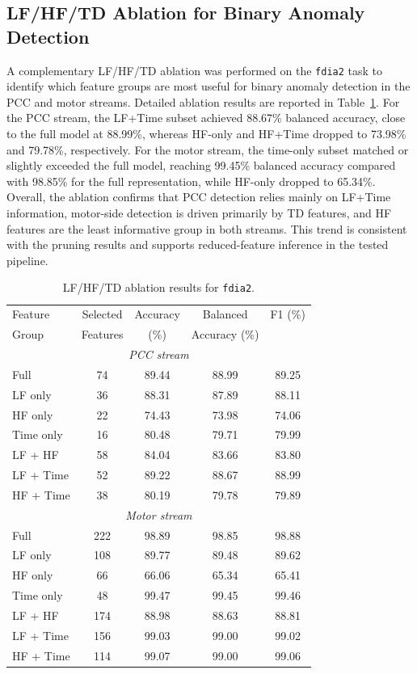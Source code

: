 \documentclass[lettersize,journal]{IEEEtran}
\begin{document}
\subsection{LF/HF/TD Ablation for Binary Anomaly Detection}
\label{sec:lfhf_ablation}
A complementary LF/HF/TD ablation was performed on the \texttt{fdia2} task to identify which feature groups are most useful for binary anomaly detection in the PCC and motor streams. Detailed ablation results are reported in Table~\ref{tab:lfhf_ablation_anomaly2}. For the PCC stream, the LF+Time subset achieved 88.67\% balanced accuracy, close to the full model at 88.99\%, whereas HF-only and HF+Time dropped to 73.98\% and 79.78\%, respectively. For the motor stream, the time-only subset matched or slightly exceeded the full model, reaching 99.45\% balanced accuracy compared with 98.85\% for the full representation, while HF-only dropped to 65.34\%. Overall, the ablation confirms that PCC detection relies mainly on LF+Time information, motor-side detection is driven primarily by TD features, and HF features are the least informative group in both streams. This trend is consistent with the pruning results and supports reduced-feature inference in the tested pipeline.
\begin{table}[t]
\centering
\caption{LF/HF/TD ablation results for \texttt{fdia2}.}
\label{tab:lfhf_ablation_anomaly2}
\renewcommand{\arraystretch}{1.15}
\begin{tabular}{l c c c c}
\hline
Feature & Selected & Accuracy & Balanced & F1 (\%) \\
Group & Features & (\%) & Accuracy (\%) & \\
\hline
\multicolumn{5}{c}{\textit{PCC stream}} \\
\hline
Full & 74  & 89.44 & 88.99 & 89.25 \\
LF only   & 36  & 88.31 & 87.89 & 88.11 \\
HF only   & 22  & 74.43 & 73.98 & 74.06 \\
Time only & 16  & 80.48 & 79.71 & 79.99 \\
LF + HF   & 58  & 84.04 & 83.66 & 83.80 \\
LF + Time & 52  & 89.22 & 88.67 & 88.99 \\
HF + Time & 38  & 80.19 & 79.78 & 79.89 \\
\hline
\multicolumn{5}{c}{\textit{Motor stream}} \\
\hline
Full      & 222 & 98.89 & 98.85 & 98.88 \\
LF only   & 108 & 89.77 & 89.48 & 89.62 \\
HF only   & 66  & 66.06 & 65.34 & 65.41 \\
Time only & 48  & 99.47 & 99.45 & 99.46 \\
LF + HF   & 174 & 88.98 & 88.63 & 88.81 \\
LF + Time & 156 & 99.03 & 99.00 & 99.02 \\
HF + Time & 114 & 99.07 & 99.00 & 99.06 \\
\hline
\end{tabular}
\end{table}
\end{document}
